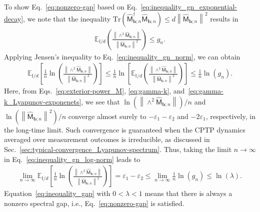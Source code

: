 \documentclass[preprint,pteplogo]{ptephy_v2}%
\numberwithin{equation}{section}
\theoremstyle{definition}
\begin{document}
To show Eq.~\eqref{eq:nonzero-gap} based on Eq.~\eqref{eq:inequality_gn_exponential-decay}, we note that the inequality $\mathrm{Tr}\left(\hat{\mathsf{M}}_{\bm{b};n}^\dagger\hat{\mathsf{M}}_{\bm{b};n}\right) \leq d\left\|\hat{\mathsf{M}}_{\bm{b};n}\right\|^2$ results in
\begin{align}
    \mathbb{E}_{\mathbb{I}/d}\left(\frac{\left\|\land^2\hat{\mathsf{M}}_{\bm{b};n}\right\|}
    {\left\|\hat{\mathsf{M}}_{\bm{b};n}\right\|^2}\right) \leq g_n.
    \label{eq:inequality_gn_norm}
\end{align}
Applying Jensen's inequality to Eq.~\eqref{eq:inequality_gn_norm}, we can obtain 
\begin{align}
    \mathbb{E}_{\mathbb{I}/d}
    \left[\frac{1}{n}\ln\left(\frac{\left\|\land^2\hat{\mathsf{M}}_{\bm{b};n}\right\|}
    {\left\|\hat{\mathsf{M}}_{\bm{b};n}\right\|^2}\right)\right]
    \leq\frac{1}{n}\ln\left[\mathbb{E}_{\mathbb{I}/d}
    \left(\frac{\left\|\land^2\hat{\mathsf{M}}_{\bm{b};n}\right\|}
    {\left\|\hat{\mathsf{M}}_{\bm{b};n}\right\|^2}\right)\right]\leq\frac{1}{n}\ln(g_n).
    \label{eq:inequality_gn_log-norm}
\end{align}
Here, from Eqs.~\eqref{eq:exterior-power_M}, \eqref{eq:gamma-k}, and~\eqref{eq:gamma-k_Lyapunov-exponenets}, we see that $\ln\left(\left\|\land^2\hat{\mathsf{M}}_{\bm{b};n}\right\|\right)/n$ and $\ln\left(\left\|\hat{\mathsf{M}}_{\bm{b};n}\right\|^2\right)/n$ converge almost surely to $-\varepsilon_1-\varepsilon_2$ and $-2\varepsilon_1$, respectively, in the long-time limit. 
Such convergence is guaranteed when the CPTP dynamics averaged over measurement outcomes is irreducible, as discussed in Sec.~\ref{sec:typical-convergence_Lyapunov-spectrum}. 
Thus, taking the limit $n\rightarrow\infty$ in Eq.~\eqref{eq:inequality_gn_log-norm} leads to
\begin{align}
    \lim_{n\rightarrow\infty}\mathbb{E}_{\mathbb{I}/d}
    \left[\frac{1}{n}
    \ln\left(\frac{\left\|\land^2\hat{\mathsf{M}}_{\bm{b};n}\right\|}
    {\left\|\hat{\mathsf{M}}_{\bm{b};n}\right\|^2}\right)\right]
    =\varepsilon_1-\varepsilon_2\leq\lim_{n\rightarrow\infty}\frac{1}{n}\ln(g_n)\leq\ln(\lambda).
    \label{eq:inequality_gap}
\end{align}
Equation~\eqref{eq:inequality_gap} with $0<\lambda<1$ means that there is always a nonzero spectral gap, i.e., Eq.~\eqref{eq:nonzero-gap} is satisfied. 
\end{document}
